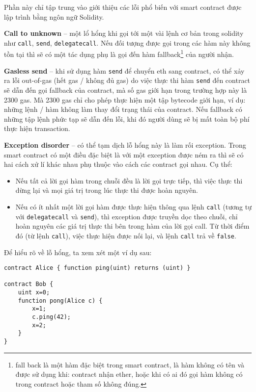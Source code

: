 \documentclass[../main-report.tex]{subfiles}
\begin{document}
Phần này chỉ tập trung vào giới thiệu các lỗi phổ biến với smart contract được lập trình bằng ngôn ngữ Solidity.

\textbf{Call to unknown} -- một lổ hổng khi gọi tới một vài lệnh cơ bản trong solidity như \texttt{call}, \texttt{send}, \texttt{delegatecall}. Nếu đối tượng được gọi trong các hàm này không tồn tại thì sẽ có một tác dụng phụ là gọi đến hàm fallback\footnote{fall back là một hàm đặc biệt trong smart contract, là hàm không có tên và được sử dụng khi: contract nhận ether, hoặc khi có ai đó gọi hàm không có trong contract hoặc tham số không đúng.} của người nhận.

\textbf{Gasless send} -- khi sử dụng hàm \texttt{send} để chuyển \gls{eth} sang contract, có thể xảy ra lỗi out-of-gas (hết gas / không đủ gas) do việc thực thi hàm \texttt{send} đến contract sẽ dẫn đến gọi fallback của contract, mà số gas giới hạn trong trường hợp này là 2300 gas. Mà 2300 gas chỉ cho phép thực hiện một tập bytecode giới hạn, ví dụ: những lệnh / hàm không làm thay đổi trạng thái của contract. Nếu fallback có những tập lệnh phức tạp sẽ dẫn đến lỗi, khi đó người dùng sẽ bị mất toàn bộ phí thực hiện transaction.

\textbf{Exception disorder} -- có thể tạm dịch lỗ hổng này là làm rối exception. Trong smart contract có một điều đặc biệt là với một exception được ném ra thì sẽ có hai cách xử lí khác nhau phụ thuộc vào cách các contract gọi nhau. Cụ thể:

\begin{itemize}
\item Nếu tất cả lời gọi hàm trong chuỗi đều là lời gọi trực tiếp, thì việc thực thi dừng lại và mọi giá trị trong lúc thực thi được hoàn nguyên.
\item Nếu có ít nhất một lời gọi hàm được thực hiện thông qua lệnh \texttt{call} (tương tự với  \texttt{delegatecall} và \texttt{send}), thì exception được truyền dọc theo chuỗi, chỉ hoàn nguyên các giá trị thực thi bên trong hàm của lời gọi call. Từ thời điểm đó (từ lệnh \texttt{call}), việc thực hiện được nối lại, và lệnh \texttt{call} trả về \texttt{false}.
\end{itemize}

Để hiểu rõ về lỗ hổng, ta xem xét một ví dụ sau:

\begin{lstlisting}
contract Alice { function ping(uint) returns (uint) }

contract Bob { 
    uint x=0;
    function pong(Alice c) {
        x=1;
        c.ping(42);
        x=2;
    }
}
\end{lstlisting}
\end{document}
